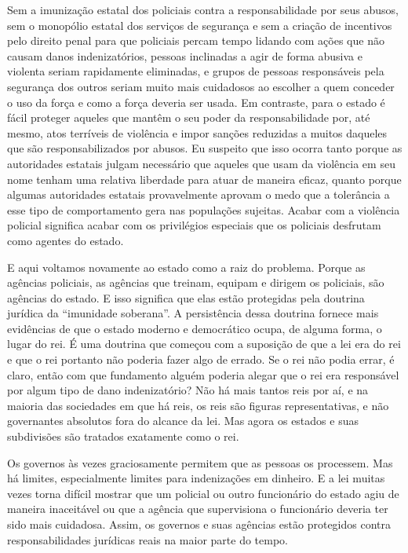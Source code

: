 Sem a imunização estatal dos policiais contra a responsabilidade por seus abusos, sem o monopólio estatal dos serviços de segurança e sem a criação de incentivos pelo direito penal para que policiais percam tempo lidando com ações que não causam danos indenizatórios, pessoas inclinadas a agir de forma abusiva e violenta seriam rapidamente eliminadas, e grupos de pessoas responsáveis pela segurança dos outros seriam muito mais cuidadosos ao escolher a quem conceder o uso da força e como a força deveria ser usada. Em contraste, para o estado é fácil proteger aqueles que mantêm o seu poder da responsabilidade por, até mesmo, atos terríveis de violência e impor sanções reduzidas a muitos daqueles que são responsabilizados por abusos. Eu suspeito que isso ocorra tanto porque as autoridades estatais julgam necessário que aqueles que usam da violência em seu nome tenham uma relativa liberdade para atuar de maneira eficaz, quanto porque algumas autoridades estatais provavelmente aprovam o medo que a tolerância a esse tipo de comportamento gera nas populações sujeitas. Acabar com a violência policial significa acabar com os privilégios especiais que os policiais desfrutam como agentes do estado.

E aqui voltamos novamente ao estado como a raiz do problema. Porque as agências policiais, as agências que treinam, equipam e dirigem os policiais, são agências do estado. E isso significa que elas estão protegidas pela doutrina jurídica da ``imunidade soberana''. A persistência dessa doutrina fornece mais evidências de que o estado moderno e democrático ocupa, de alguma forma, o lugar do rei. É uma doutrina que começou com a suposição de que a lei era do rei e que o rei portanto não poderia fazer algo de errado. Se o rei não podia errar, é claro, então com que fundamento alguém poderia alegar que o rei era responsável por algum tipo de dano indenizatório? Não há mais tantos reis por aí, e na maioria das sociedades em que há reis, os reis são figuras representativas, e não governantes absolutos fora do alcance da lei. Mas agora os estados e suas subdivisões são tratados exatamente como o rei.

Os governos às vezes graciosamente permitem que as pessoas os processem. Mas há limites, especialmente limites para indenizações em dinheiro. E a lei muitas vezes torna difícil mostrar que um policial ou outro funcionário do estado agiu de maneira inaceitável ou que a agência que supervisiona o funcionário deveria ter sido mais cuidadosa. Assim, os governos e suas agências estão protegidos contra responsabilidades jurídicas reais na maior parte do tempo.

